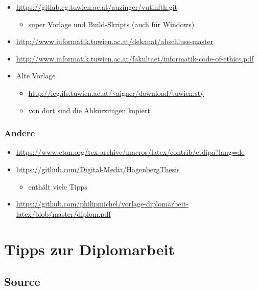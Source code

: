 \begin{itemize}
\tightlist
\item
  \url{https://gitlab.cg.tuwien.ac.at/auzinger/vutinfth.git}

  \begin{itemize}
  \tightlist
  \item
    super Vorlage und Build-Skripts (auch für Windows)
  \end{itemize}
\item
  \url{http://www.informatik.tuwien.ac.at/dekanat/abschluss-master}
\item
  \url{http://www.informatik.tuwien.ac.at/fakultaet/informatik-code-of-ethics.pdf}
\item
  Alte Vorlage

  \begin{itemize}
  \tightlist
  \item
    \url{http://ieg.ifs.tuwien.ac.at/~aigner/download/tuwien.sty}
  \item
    von dort sind die Abkürzungen kopiert
  \end{itemize}
\end{itemize}

\hypertarget{andere}{%
\subsubsection{Andere}\label{andere}}

\begin{itemize}
\tightlist
\item
  \url{https://www.ctan.org/tex-archive/macros/latex/contrib/etdipa?lang=de}
\item
  \url{https://github.com/Digital-Media/HagenbergThesis}

  \begin{itemize}
  \tightlist
  \item
    enthält viele Tipps
  \end{itemize}
\item
  \url{https://github.com/philipmichel/vorlage-diplomarbeit-latex/blob/master/diplom.pdf}
\end{itemize}

\hypertarget{tipps-zur-diplomarbeit}{%
\section{Tipps zur Diplomarbeit}\label{tipps-zur-diplomarbeit}}

\hypertarget{source}{%
\subsection{Source}\label{source}}

